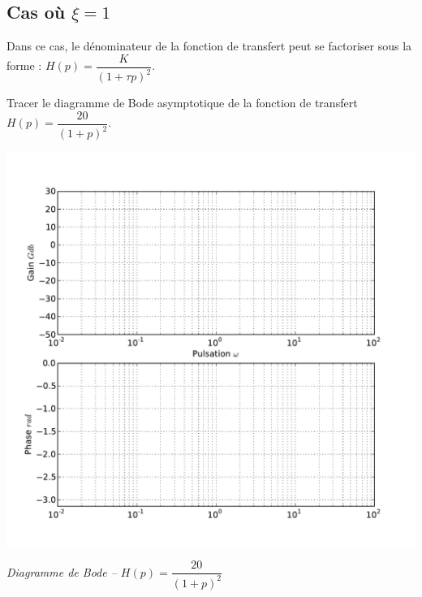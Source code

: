 \documentclass[10pt,oneside]{article}
\begin{document}



\subsection{Cas où $\xi=1$}
Dans ce cas, le dénominateur de la fonction de transfert peut se factoriser sous la forme :
$H(p)=\dfrac{K}{\left(1+\tau p \right)^2}$.

Tracer le diagramme de Bode asymptotique de la fonction de transfert 
$H(p)=\dfrac{20}{\left(1+ p \right)^2}$.

\begin{center}
\includegraphics[width=.9\textwidth]{png/bode_vierge}

\textit{Diagramme de Bode -- $H(p)=\dfrac{20}{\left(1+ p \right)^2}$}
\end{center}

\end{document}
